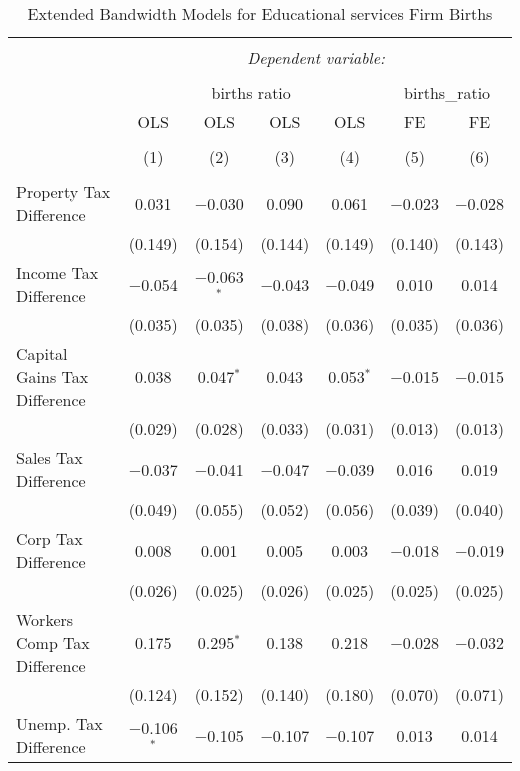 
\begin{table}[!htbp] \centering 
  \caption{Extended Bandwidth Models for  Educational services Firm Births} 
  \label{61eb} 
\begin{tabular}{@{\extracolsep{5pt}}lcccccc} 
\\[-1.8ex]\hline 
\hline \\[-1.8ex] 
 & \multicolumn{6}{c}{\textit{Dependent variable:}} \\ 
\cline{2-7} 
\\[-1.8ex] & \multicolumn{4}{c}{births ratio} & \multicolumn{2}{c}{births\_ratio} \\ 
 & OLS & OLS & OLS & OLS & FE & FE \\ 
\\[-1.8ex] & (1) & (2) & (3) & (4) & (5) & (6)\\ 
\hline \\[-1.8ex] 
 Property Tax Difference & 0.031 & $-$0.030 & 0.090 & 0.061 & $-$0.023 & $-$0.028 \\ 
  & (0.149) & (0.154) & (0.144) & (0.149) & (0.140) & (0.143) \\ 
  Income Tax Difference & $-$0.054 & $-$0.063$^{*}$ & $-$0.043 & $-$0.049 & 0.010 & 0.014 \\ 
  & (0.035) & (0.035) & (0.038) & (0.036) & (0.035) & (0.036) \\ 
  Capital Gains Tax Difference & 0.038 & 0.047$^{*}$ & 0.043 & 0.053$^{*}$ & $-$0.015 & $-$0.015 \\ 
  & (0.029) & (0.028) & (0.033) & (0.031) & (0.013) & (0.013) \\ 
  Sales Tax Difference & $-$0.037 & $-$0.041 & $-$0.047 & $-$0.039 & 0.016 & 0.019 \\ 
  & (0.049) & (0.055) & (0.052) & (0.056) & (0.039) & (0.040) \\ 
  Corp Tax Difference & 0.008 & 0.001 & 0.005 & 0.003 & $-$0.018 & $-$0.019 \\ 
  & (0.026) & (0.025) & (0.026) & (0.025) & (0.025) & (0.025) \\ 
  Workers Comp Tax Difference & 0.175 & 0.295$^{*}$ & 0.138 & 0.218 & $-$0.028 & $-$0.032 \\ 
  & (0.124) & (0.152) & (0.140) & (0.180) & (0.070) & (0.071) \\ 
  Unemp. Tax Difference & $-$0.106$^{*}$ & $-$0.105 & $-$0.107 & $-$0.107 & 0.013 & 0.014 \\ 

\end{tabular}
\end{table}
